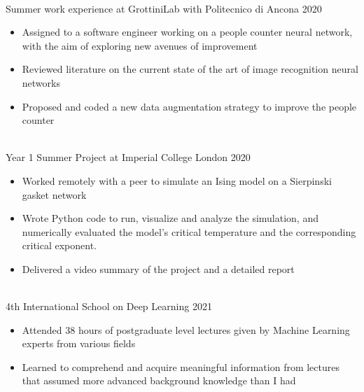 \documentclass{res}[12pt] %
\begin{document}
\begin{resume}
  \\ Summer work experience at GrottiniLab with Politecnico di Ancona \href{https://github.com/jacopouggeri/curriculumVitae/blob/84ad9712112b11ea237b126a98ba1764b27054b4/attachments/grottini.pdf}{\attachment} \hfill 2020
\begin{itemize}
\item Assigned to a software engineer working on a people counter neural network, with the aim of exploring new avenues of improvement
\item Reviewed literature on the current state of the art of image recognition neural networks
\item Proposed and coded a new data augmentation strategy to improve the people counter
\end{itemize}

 \\ Year 1 Summer Project at Imperial College London  \hfill 2020
\begin{itemize}
\item Worked remotely with a peer to simulate an Ising model on a Sierpinski gasket network
\item Wrote Python code to run, visualize and analyze the simulation, and numerically evaluated the model’s critical temperature and the corresponding critical exponent.
\item Delivered a video summary of the project and a detailed report
\end{itemize}


 


\sectionRule
\vspace{6pt} %

 \\ 4th International School on Deep Learning \href{https://github.com/jacopouggeri/curriculumVitae/blob/84ad9712112b11ea237b126a98ba1764b27054b4/attachments/deeplearn.pdf}{\attachment} \hfill 2021
\begin{itemize}
\item Attended 38 hours of postgraduate level lectures given by Machine Learning experts from various fields
\item Learned to comprehend and acquire meaningful information from lectures that assumed more advanced background knowledge than I had
\end{itemize}


\end{resume}
\end{document}
